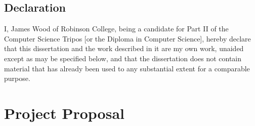 \documentclass[12pt,a4paper,twoside,openright]{report}
\begin{document}
\newpage
\section*{Declaration}

I, James Wood of Robinson College, being a candidate for Part II of the Computer Science Tripos [or the Diploma in Computer Science], hereby declare that this dissertation and the work described in it are my own work, unaided except as may be specified below, and that the dissertation does not contain material that has already been used to any substantial extent for a comparable purpose.

\bigskip
{}

\medskip
{}

\tableofcontents

\listoffigures


\pagestyle{headings}




%







%




\chapter{Project Proposal}


\end{document}
